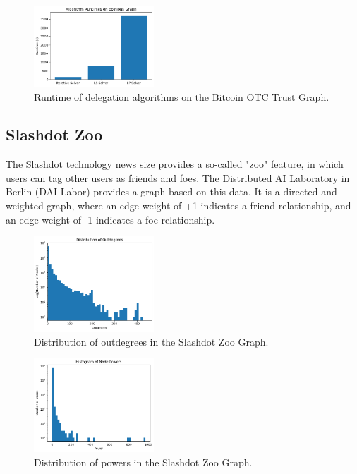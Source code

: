 \begin{figure}[h]
    \centering
    \includegraphics[width=0.4\textwidth]{bitcoinotc_dataset}
    \caption{Runtime of delegation algorithms on the Bitcoin OTC Trust Graph.}
    \label{fig:bitcoinotc_runtimes}
\end{figure}
 

\subsection{Slashdot Zoo}

The Slashdot technology news size provides a so-called "zoo" feature, in which users can tag other users as friends and foes. 
 The Distributed AI Laboratory in Berlin (DAI Labor) provides a graph based on this data.  It is a directed and weighted graph, where an edge weight of +1 indicates a friend relationship, and an edge weight of -1 indicates a foe relationship.
 
 \begin{figure}[h]
    \centering
    \includegraphics[width=0.4\textwidth]{slashdot_outdegree_distr}
    \caption{Distribution of outdegrees in the Slashdot Zoo Graph.}
    \label{fig:slashdot_outdegrees}
\end{figure}


 \begin{figure}[h]
    \centering
    \includegraphics[width=0.4\textwidth]{slashdot_power_distr}
    \caption{Distribution of powers in the Slashdot Zoo Graph.}
    \label{fig:slashdot_powers}
\end{figure}

